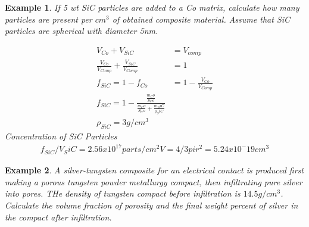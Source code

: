 \documentclass{article}
\newtheorem{theorem}{Example}
\begin{document}
\begin{theorem}
    If 5 wt SiC particles are added to a Co matrix, calculate how many particles are present per $cm^3$ of obtained composite material. Assume that SiC particles are spherical with diameter 5nm.

    \begin{equation*}
        \begin{aligned}
            V_{Co} + V_{SiC}                                   & = V_{comp}                    \\
            \frac{V_{Co}}{V_{Comp}} + \frac{V_{SiC}}{V_{Comp}} & = 1                           \\
            f_{SiC} = 1- f_{Co}                                & = 1 - \frac{V_{Co}}{V_{Comp}} \\
            f_{SiC} = 1 - \frac{\frac{m_Co}{S_Co}}{\frac{m_Co}{S_Co}+\frac{m_SiC}{\rho_SiC}}   \\
            \rho_{SiC} = 3 g/cm^3
        \end{aligned}
    \end{equation*}
    Concentration of SiC Particles
    \begin{equation*}
        \begin{aligned}
            f_{SiC}/ V_SiC = 2.56x10^17 parts/cm^2
            V= 4/3 pi r^2 = 5.24x10^-19cm^3
        \end{aligned}
    \end{equation*}

\end{theorem}
\begin{theorem}
    A silver-tungsten composite for an electrical contact is produced first making a porous tungsten powder metallurgy compact, then infiltrating pure silver into pores. THe density of tungsten compact before infiltration is $14.5 g/cm^3$. Calculate the volume fraction of porosity and the final weight percent of silver in the compact after infiltration.

\end{theorem}
\end{document}
